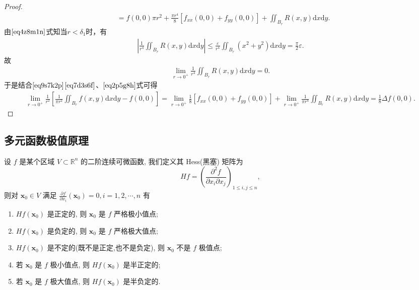 \documentclass[../../main.tex]{subfiles}%
\begin{document}
\begin{proof}
\begin{align}
&= f(0,0)\pi r^2 + \frac{\pi r^4}{8}\left[ f_{xx}(0,0) + f_{yy}(0,0) \right] + \iint_{B_r}R(x,y)\mathrm{d}x\mathrm{d}y. \label{eq7d3s6f}
\end{align}
由$\eqref{eq4z8m1n}$式知当$r<\delta_1$时，有
\begin{align*}
\left| \frac{1}{r^4}\iint_{B_r} R(x,y)\mathrm{d}x\mathrm{d}y \right| \leqslant \frac{\varepsilon}{r^4}\iint_{B_r} (x^2+y^2)\mathrm{d}x\mathrm{d}y=\frac{\pi}{2}\varepsilon.
\end{align*}
故
\begin{align}
\lim\limits_{r\to 0^+} \frac{1}{r^4}\iint_{B_r} R(x,y)\mathrm{d}x\mathrm{d}y=0. \label{eq2p5g8h}
\end{align}
于是结合$\eqref{eq9s7k2p}$$\eqref{eq7d3s6f}$、$\eqref{eq2p5g8h}$式可得
\begin{align*}
\lim\limits_{r\to 0^+} \frac{1}{r^2}\left[ \frac{1}{\pi r^2}\iint_{B_r} f(x,y)\mathrm{d}x\mathrm{d}y - f(0,0) \right] = \lim\limits_{r\to 0^+} \frac{1}{8}\left[ f_{xx}(0,0) + f_{yy}(0,0) \right] + \lim\limits_{r\to 0^+}\frac{1}{\pi r^4}\iint_{B_r}R(x,y)\mathrm{d}x\mathrm{d}y 
= \frac{1}{8}\Delta f(0,0).
\end{align*}
\end{proof}





\subsection{多元函数极值原理}

\begin{theorem}[多元函数极值的判定方法]\label{theorem:用矩阵判定极值}
设 \( f \) 是某个区域 \( V \subset \mathbb{R}^n \) 的二阶连续可微函数, 我们定义其 Hess(黑塞) 矩阵为
\[
Hf = \left( \frac{\partial^2 f}{\partial x_i \partial x_j} \right)_{1 \leqslant i, j \leqslant n},
\]
则对 \( \mathbf{x}_0 \in V \) 满足 \( \frac{\partial f}{\partial x_i}(\mathbf{x}_0) = 0, i = 1, 2, \cdots, n \) 有
\begin{enumerate}
\item \( Hf(\mathbf{x}_0) \) 是正定的, 则 \( \mathbf{x}_0 \) 是 \( f \) 严格极小值点;

\item \( Hf(\mathbf{x}_0) \) 是负定的, 则 \( \mathbf{x}_0 \) 是 \( f \) 严格极大值点;

\item \( Hf(\mathbf{x}_0) \) 是不定的(既不是正定,也不是负定), 则 \( \mathbf{x}_0 \) 不是 \( f \) 极值点;

\item 若 \( \mathbf{x}_0 \) 是 \( f \) 极小值点, 则 \( Hf(\mathbf{x}_0) \) 是半正定的;

\item 若 \( \mathbf{x}_0 \) 是 \( f \) 极大值点, 则 \( Hf(\mathbf{x}_0) \) 是半负定的.
\end{enumerate}
\end{theorem}
\end{document}
